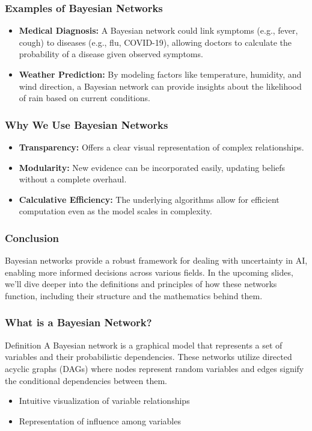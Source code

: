 \documentclass[aspectratio=169]{beamer}
\begin{document}
\begin{frame}[fragile]
    \frametitle{Examples of Bayesian Networks}
    \begin{itemize}
        \item \textbf{Medical Diagnosis:} 
        A Bayesian network could link symptoms (e.g., fever, cough) to diseases (e.g., flu, COVID-19), allowing doctors to calculate the probability of a disease given observed symptoms.
        
        \item \textbf{Weather Prediction:} 
        By modeling factors like temperature, humidity, and wind direction, a Bayesian network can provide insights about the likelihood of rain based on current conditions.
    \end{itemize}
\end{frame}

\begin{frame}[fragile]
    \frametitle{Why We Use Bayesian Networks}
    \begin{itemize}
        \item \textbf{Transparency:} 
        Offers a clear visual representation of complex relationships.
        
        \item \textbf{Modularity:} 
        New evidence can be incorporated easily, updating beliefs without a complete overhaul.
        
        \item \textbf{Calculative Efficiency:} 
        The underlying algorithms allow for efficient computation even as the model scales in complexity.
    \end{itemize}
\end{frame}

\begin{frame}[fragile]
    \frametitle{Conclusion}
    Bayesian networks provide a robust framework for dealing with uncertainty in AI, enabling more informed decisions across various fields. 
    In the upcoming slides, we'll dive deeper into the definitions and principles of how these networks function, including their structure and the mathematics behind them.
\end{frame}

\begin{frame}[fragile]
    \frametitle{What is a Bayesian Network?}
    
    \begin{block}{Definition}
        A Bayesian network is a graphical model that represents a set of variables and their probabilistic dependencies. 
        These networks utilize directed acyclic graphs (DAGs) where nodes represent random variables and edges signify the conditional dependencies between them.
    \end{block}
    
    \begin{itemize}
        \item Intuitive visualization of variable relationships
        \item Representation of influence among variables
    \end{itemize}
\end{frame}
\end{document}
